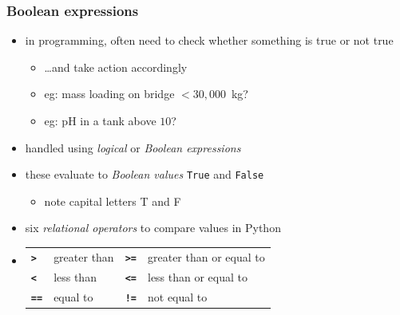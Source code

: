 \documentclass[english,14pt]{beamer}
\newcommand\red[1]{{\color{red} #1}}
\begin{document}
\begin{frame}[fragile]

\frametitle{Boolean expressions}
	
\begin{itemize}
	\item in programming, often need to check whether something is true or not true
	\begin{itemize}
		\item \ldots and take action accordingly
		\item[] eg: mass loading on bridge $< 30,000$~kg?
		\item[] eg: pH in a tank above $10$?
	\end{itemize}
	
	\item handled using \red{\emph{logical}} or \red{\emph{Boolean expressions}}

	\item these evaluate to \red{\emph{Boolean values}} \texttt{True} and \texttt{False}
	\begin{itemize}
		\item note capital letters T and F
	\end{itemize}
	\item  six \red{\emph{relational operators}} to compare values in Python
	
	\item[]	\begin{itemize}[]
		\begin{tabular}{llll}
		\textbf{\texttt{>}} 	&  greater than\qquad\qquad 	& \textbf{\texttt{>=}} 	& greater than or equal to \\
		\textbf{\texttt{<}} 	&  less than\qquad\qquad 		& \textbf{\texttt{<=}} 	& less than or equal to \\						\textbf{\texttt{==}} 	&  equal to\qquad\qquad 		& \textbf{\texttt{!=}} 		& not equal to
		\end{tabular}
	\end{itemize}
	 
\end{itemize}

\end{frame}

\end{document}
